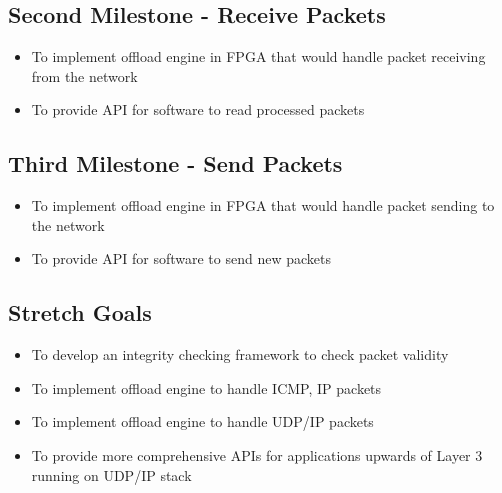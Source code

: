 \documentclass[a4paper,11pt]{scrartcl}
\begin{document}
\subsection{Second Milestone - Receive Packets}
\begin{itemize}
    \item To implement offload engine in FPGA that would handle packet receiving from the network
    \item To provide API for software to read processed packets
\end{itemize}

\subsection{Third Milestone - Send Packets}
\begin{itemize}
    \item To implement offload engine in FPGA that would handle packet sending to the network
    \item To provide API for software to send new packets
\end{itemize}

\subsection{Stretch Goals}
\begin{itemize}
    \item To develop an integrity checking framework to check packet validity
    \item To implement offload engine to handle ICMP, IP packets
    \item To implement offload engine to handle UDP/IP packets
    \item To provide more comprehensive APIs for applications upwards of Layer 3 running on UDP/IP stack
\end{itemize}



\end{document}
